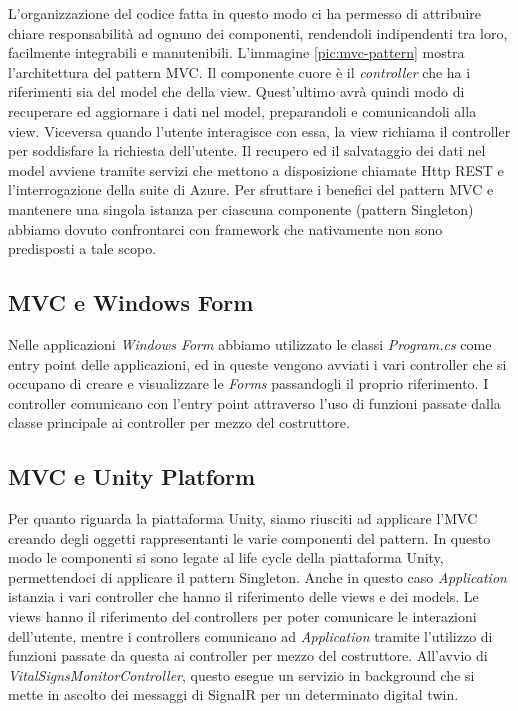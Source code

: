 L'organizzazione del codice fatta in questo modo ci ha permesso di attribuire chiare responsabilità ad ognuno dei componenti, rendendoli indipendenti tra loro, facilmente integrabili e manutenibili. \newline \newline L'immagine \ref{pic:mvc-pattern} mostra l'architettura del pattern MVC. Il componente cuore è il \textit{controller} che ha i riferimenti sia del model che della view. Quest'ultimo avrà quindi modo di recuperare ed aggiornare i dati nel model, preparandoli e comunicandoli alla view. \newline \newline Viceversa quando l'utente interagisce con essa, la view richiama il controller per soddisfare la richiesta dell'utente. \newline \newline Il recupero ed il salvataggio dei dati nel model avviene tramite servizi che mettono a disposizione chiamate Http REST e l'interrogazione della suite di Azure. Per sfruttare i benefici del pattern MVC e mantenere una singola istanza per ciascuna componente (pattern Singleton) abbiamo dovuto confrontarci con framework che nativamente non sono predisposti a tale scopo.

\subsection{MVC e Windows Form}

Nelle applicazioni \textit{Windows Form} abbiamo utilizzato le classi \textit{Program.cs} come entry point delle applicazioni, ed in queste vengono avviati i vari controller che si occupano di creare e visualizzare le \textit{Forms} passandogli il proprio riferimento. I controller comunicano con l'entry point attraverso l'uso di funzioni passate dalla classe principale ai controller per mezzo del costruttore.

\subsection{MVC e Unity Platform}
Per quanto riguarda la piattaforma Unity, siamo riusciti ad applicare l'MVC creando degli oggetti rappresentanti le varie componenti del pattern. In questo modo le componenti si sono legate al life cycle della piattaforma Unity, permettendoci di applicare il pattern Singleton. Anche in questo caso \textit{Application} istanzia i vari controller che hanno il riferimento delle views e dei models. Le views hanno il riferimento del controllers per poter comunicare le interazioni dell'utente, mentre i controllers comunicano ad \textit{Application} tramite l'utilizzo di funzioni passate da questa ai controller per mezzo del costruttore. \newline \newline All'avvio di \textit{VitalSignsMonitorController}, questo esegue un servizio in background che si mette in ascolto dei messaggi di SignalR per un determinato digital twin.

